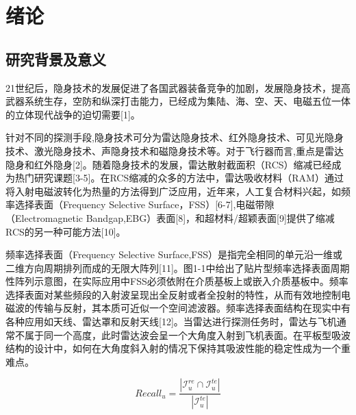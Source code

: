 \section{绪论}

\subsection{研究背景及意义}

21世纪后\cite{rendle2009bpr}，隐身技术的发展促进了各国武器装备竞争的加剧，发展隐身技术，提高武器系统生存，空防和纵深打击能力，已经成为集陆、海、空、天、电磁五位一体的立体现代战争的迫切需要[1]。

针对不同的探测手段,隐身技术可分为雷达隐身技术、红外隐身技术、可见光隐身技术、激光隐身技术、声隐身技术和磁隐身技术等。对于飞行器而言,重点是雷达隐身和红外隐身[2]。随着隐身技术的发展，雷达散射截面积（RCS）缩减已经成为热门研究课题[3-5]。在RCS缩减的众多的方法中，雷达吸收材料（RAM）通过将入射电磁波转化为热量的方法得到广泛应用，近年来，人工复合材料兴起，如频率选择表面（Frequency Selective Surface，FSS）[6-7],电磁带隙（Electromagnetic Bandgap,EBG）表面[8]，和超材料/超颖表面[9]提供了缩减RCS的另一种可能方法[10]。

频率选择表面（Frequency Selective Surface,FSS）是指完全相同的单元沿一维或二维方向周期排列而成的无限大阵列[11]。图1-1中给出了贴片型频率选择表面周期性阵列示意图，在实际应用中FSS必须依附在介质基板上或嵌入介质基板中。频率选择表面对某些频段的入射波呈现出全反射或者全投射的特性，从而有效地控制电磁波的传输与反射，其本质可近似一个空间滤波器。频率选择表面结构在现实中有各种应用如天线、雷达罩和反射天线[12]。当雷达进行探测任务时，雷达与飞机通常不属于同一个高度，此时雷达波会呈一个大角度入射到飞机表面。在平板型吸波结构的设计中，如何在大角度斜入射的情况下保持其吸波性能的稳定性成为一个重难点。

\begin{equation*}
    Recall_u = \frac{|\mathcal{I}_u^{re} \cap \mathcal{I}_u^{te}|}{|\mathcal{I}_u^{te}|}
    \end{equation*}
